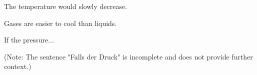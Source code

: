 The temperature would slowly decrease.  

Gases are easier to cool than liquids.  

If the pressure...  

(Note: The sentence "Falls der Druck" is incomplete and does not provide further context.)